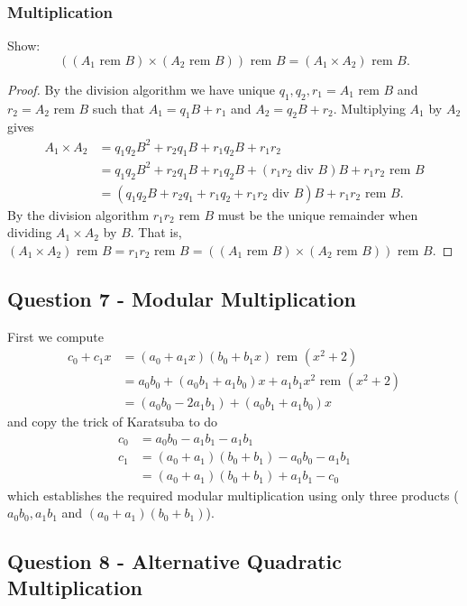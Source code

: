 \documentclass[12pt]{report}
\newcommand{\rem}{\text{ rem }}
\newcommand{\quo}{\text{ div }}
\begin{document}
\subsubsection{Multiplication}
Show: $$( (A_1 \rem B) \times (A_2 \rem B) ) \rem B = (A_1 \times A_2) \rem B.$$

\begin{proof}
By the division algorithm we have unique $q_1,q_2,r_1=A_1 \rem B$ and $r_2 = A_2 \rem B$ such that $A_1 = q_1 B + r_1$ and $A_2 = q_2 B + r_2$. Multiplying $A_1$ by $A_2$ gives
\begin{align*}
A_1 \times A_2 &= q_1q_2B^2 + r_2q_1B + r_1q_2B + r_1r_2\\
&= q_1q_2B^2 + r_2q_1B + r_1q_2B + (r_1r_2 \quo B) B + r_1r_2 \rem B \\
&= (q_1q_2B + r_2q_1 + r_1q_2 + r_1r_2 \quo B)B + r_1r_2 \rem B.
\end{align*}
By the division algorithm $r_1r_2 \rem B$ must be the unique remainder when dividing $A_1 \times A_2$ by $B$. That is, $(A_1 \times A_2) \rem B = r_1r_2 \rem B = ( (A_1 \rem B) \times (A_2 \rem B) ) \rem B$.
\end{proof}

\subsection*{Question 7 - Modular Multiplication}
First we compute
\begin{align*}
c_0 + c_1x &= (a_0+a_1x)(b_0+b_1x) \rem (x^2+2) \\
&= a_0b_0 + (a_0b_1 + a_1b_0)x + a_1b_1x^2 \rem(x^2+2) \\
&= (a_0b_0-2a_1b_1) + (a_0b_1 + a_1b_0)x
\end{align*}
and copy the trick of Karatsuba to do
\begin{align*}
c_0 &= a_0b_0 - a_1b_1 - a_1b_1\\
c_1 &= (a_0+a_1)(b_0+b_1) - a_0b_0 - a_1b_1  \\
&= (a_0+a_1)(b_0+b_1) +a_1b_1- c_0
\end{align*}
which establishes the required modular multiplication using only three products ($a_0b_0, a_1b_1$ and $(a_0+a_1)(b_0+b_1)$).

\subsection*{Question 8 - Alternative Quadratic Multiplication}
\end{document}
